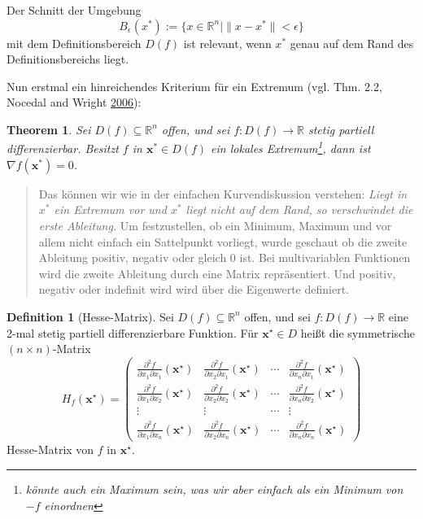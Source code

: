 \documentclass[]{book}
\newenvironment {JHSAYS} [0] {\begin{quote}\color{jhsc}} {\end{quote}}
\newtheorem{theorem}{Theorem}[chapter]
\theoremstyle{definition}
\newtheorem{definition}{Definition}[chapter]
\theoremstyle{definition}
\theoremstyle{definition}
\theoremstyle{definition}
\theoremstyle{remark}
\begin{document}
Der Schnitt der Umgebung
\[ B_\epsilon(x^*) := \{x\in \mathbb R^{n}| \|x-x^*\|< \epsilon\} \]
mit dem Definitionsbereich \(D(f)\) ist relevant, wenn \(x^*\) genau auf dem Rand des Definitionsbereichs liegt.

Nun erstmal ein hinreichendes Kriterium für ein Extremum
(vgl. Thm. 2.2, Nocedal and Wright \protect\hyperlink{ref-NocW06}{2006}):

\begin{theorem}
Sei \(D(f) \subseteq \mathbb{R}^{n}\) offen, und sei \(f\colon D(f) \rightarrow \mathbb{R}\) stetig partiell differenzierbar. Besitzt \(f\) in \(\mathbf{x}^{*} \in D(f)\) ein lokales Extremum\footnote{könnte auch ein Maximum sein, was wir aber einfach als ein Minimum von \(-f\) einordnen}, dann ist \(\nabla f(\mathbf{x}^{*})=0\).
\end{theorem}

\begin{JHSAYS}
Das können wir wie in der einfachen Kurvendiskussion verstehen: \emph{Liegt in \(x^*\) ein Extremum vor und \(x^*\) liegt nicht auf dem Rand, so verschwindet die erste Ableitung.} Um festzustellen, ob ein Minimum, Maximum und vor allem nicht einfach ein Sattelpunkt vorliegt, wurde geschaut ob die zweite Ableitung positiv, negativ oder gleich 0 ist. Bei multivariablen Funktionen wird die zweite Ableitung durch eine Matrix repräsentiert. Und positiv, negativ oder indefinit wird wird über die Eigenwerte definiert.

\end{JHSAYS}

\begin{definition}[Hesse-Matrix]
Sei \(D(f) \subseteq \mathbb{R}^{n}\) offen, und sei \(f\colon D(f) \rightarrow \mathbb{R}\) eine 2-mal stetig partiell differenzierbare Funktion. Für \(\mathbf{x}^{\star} \in D\) heißt die symmetrische \((n \times n)\)-Matrix
\[
H_{f}\left(\mathbf{x}^{\star}\right)=\left(\begin{array}{cccc}
\frac{\partial^{2} f}{\partial x_{1} \partial x_{1}}\left(\mathbf{x}^{\star}\right) & \frac{\partial^{2} f}{\partial x_{2} \partial x_{1}}\left(\mathbf{x}^{\star}\right) & \cdots & \frac{\partial^{2} f}{\partial x_{n} \partial x_{1}}\left(\mathbf{x}^{\star}\right) \\
\frac{\partial^{2} f}{\partial x_{1} \partial x_{2}}\left(\mathbf{x}^{\star}\right) & \frac{\partial^{2} f}{\partial x_{2} \partial x_{2}}\left(\mathbf{x}^{\star}\right) & \cdots & \frac{\partial^{2} f}{\partial x_{n} \partial x_{2}}\left(\mathbf{x}^{\star}\right) \\
\vdots & \vdots & \cdots & \vdots \\
\frac{\partial^{2} f}{\partial x_{1} \partial x_{n}}\left(\mathbf{x}^{\star}\right) & \frac{\partial^{2} f}{\partial x_{2} \partial x_{n}}\left(\mathbf{x}^{\star}\right) & \cdots & \frac{\partial^{2} f}{\partial x_{n} \partial x_{n}}\left(\mathbf{x}^{\star}\right)
\end{array}\right)
\]
Hesse-Matrix von \(f\) in \(\mathbf{x}^{\star}\).
\end{definition}
\end{document}
